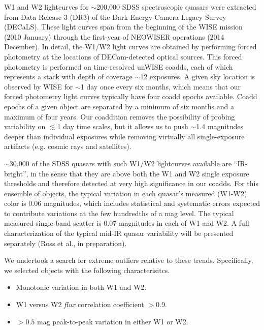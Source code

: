 \documentclass{emulateapj}
\begin{document}
W1 and W2 lightcurves for $\sim$200,000 SDSS spectroscopic quasars
were extracted from Data Release 3 (DR3) of the Dark Energy Camera
Legacy Survey (DECaLS). These light curves span from the beginning of
the WISE mission (2010 January) through the first-year of NEOWISER
operations (2014 December). In detail, the W1/W2 light curves are
obtained by performing forced photometry at the locations of
DECam-detected optical sources. This forced photometry is performed on
time-resolved unWISE coadds, each of which represents a stack with
depth of coverage $\sim$12 exposures. A given sky location is observed
by WISE for $\sim$1 day once every six months, which means that our
forced photometry light curves typically have four coadd epochs
available. Coadd epochs of a given object are separated by a minimum
of six months and a maximum of four years. Our coaddition removes the
possibility of probing variability on $\lesssim$1 day time scales, but
it allows us to push $\sim$1.4 magnitudes deeper than individual
exposures while removing virtually all single-exposure artifacts
(e.g. cosmic rays and satellites).

$\sim$30,000 of the SDSS quasars with such W1/W2 lightcurves available
are ``IR-bright'', in the sense that they are above both the W1 and W2
single exposure thresholds and therefore detected at very high
significance in our coadds. For this ensemble of objects, the typical
variation in each quasar's measured (W1-W2) color is 0.06 magnitudes,
which includes statistical and systematic errors expected to
contribute variations at the few hundredths of a mag level. The
typical measured single-band scatter is 0.07 magnitudes in each of W1
and W2. A full characterization of the typical mid-IR quasar
variability will be presented separately (Ross et al., in
preparation).

We undertook a search for extreme outliers relative to these trends.
Specifically, we selected objects with the following characterisitcs.

\begin{itemize}
\item Monotonic variation in both W1 and W2.
\item W1 versus W2 \textit{flux} correlation coefficient $>$0.9.
\item $>0.5$ mag peak-to-peak variation in either W1 or W2.
\end{itemize}
\end{document}
